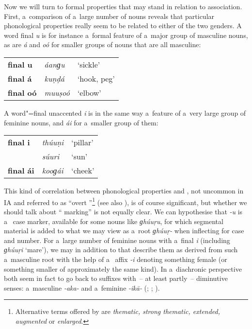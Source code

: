 Now we will turn to formal properties that may stand in relation to  association. First, a~comparison of a~large number of nouns reveals that particular phonological properties really seem to be related to either of the two genders. A word final \textit{u} is for instance a~formal feature of a~major group of masculine nouns, as are \textit{á} and \textit{oó} for smaller groups of nouns that are all masculine:



\begin{table}[H]
\begin{tabularx}{\textwidth}{ l l l }
\textbf{final u} &
\textit{áanɡu} &
`sickle'\\
\textbf{final á} &
\textit{kuṇḍá} &
`hook, peg'\\
\textbf{final oó} &
\textit{muuṣoó} &
`elbow'\\
\end{tabularx}
\end{table}

A word"=final unaccented \textit{i} is in the same way a~feature of a~very large group of feminine nouns, and \textit{ái} for a~smaller group of them:


\begin{table}[H]
\begin{tabularx}{\textwidth}{ l l l }
\textbf{final i} &
\textit{thúuṇi} &
`pillar'\\
&
\textit{súuri} &
`sun'\\
\textbf{final ái} &
\textit{kooɡái} &
`cheek'\\
\end{tabularx}
\end{table}

This kind of correlation between phonological properties and , not uncommon in IA \citep[219]{masica1991} and referred to as ``overt ''\footnote{Alternative terms offered by \citet[219]{masica1991} are \textit{thematic, strong thematic, extended, augmented} or \textit{enlarged}.} (see also \citealt[44, 62]{corbett1991}), is of course significant, but whether we should talk about `` marking'' is not equally clear. We can hypothesise that \textit{-u} is a~ case marker, available for some nouns like \textit{ɡhúuṛu}, for which segmental material is added to what we may view as a~root \textit{ɡhúuṛ-} when inflecting for case and number. For a~large number of feminine nouns with a~final \textit{i} (including \textit{ɡhúuṛi} `mare'), we may in addition to that describe them as derived from such a~masculine root with the help of a~ affix \textit{-i} denoting something female (or something smaller of approximately the same kind). In a~diachronic perspective both seem in fact to go back to   suffixes with~-- at least partly~-- diminutive senses: a~masculine \textit{-aka-} and a~feminine \textit{-ikā-} (\citealt[222]{masica1991}; \citealt[15]{morgenstierne1941}; \citealt[29]{buddruss1967}).


